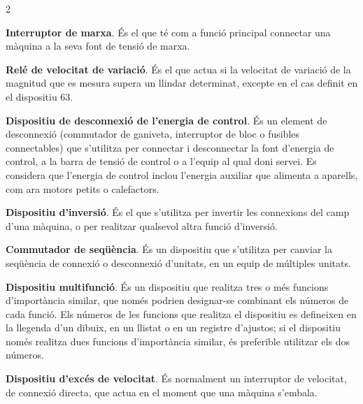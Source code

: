 \begin{multicols}{2}
\begin{list}{}
		\item[\textbf{6}]  
		\textbf{Interruptor de marxa}. És
		el que té com a funció principal connectar una màquina a la seva font de tensió de marxa.
		
		\item[\textbf{7}]    
		\textbf{Relé de velocitat de variació}. És el que
		actua si la velocitat de variació de la magnitud que es mesura supera un llindar determinat, excepte en el cas definit en el dispositiu 63.
		
		\item[\textbf{8}]   
		\textbf{Dispositiu de desconnexió de l'energia de control}. És un element de desconnexió (commutador de ganiveta,
		interruptor de bloc o fusibles connectables) que s'utilitza per
		connectar i desconnectar la font d'energia de control,  a la barra
		de tensió de control o a l'equip al qual doni servei. Es considera
		que l'energia de control inclou  l'energia auxiliar que alimenta a
		aparells, com ara motors petits o calefactors.
		
		\item[\textbf{9}]   
		\textbf{Dispositiu d'inversió}. És el
		que s'utilitza per invertir les connexions del camp d'una màquina, o
		per realitzar qualsevol altra funció  d'inversió.
		
		\item[\textbf{10}]   
		\textbf{Commutador de seqüència}. És un
		dispositiu que s'utilitza per canviar la seqüència de connexió o
		desconnexió d'unitats, en un equip de múltiples unitats.
		
		
		\item[\textbf{11}]  
		\textbf{Dispositiu multifunció}. És un dispositiu que realitza tres o més funcions d'importància similar, que només podrien designar-se combinant els números de cada funció. Els números de les funcions que realitza el dispositiu es defineixen en la llegenda d'un dibuix, en un llistat o en un registre d'ajustos; si el dispositiu només realitza dues funcions d'importància similar, és preferible utilitzar els dos números.
		
		\item[\textbf{12}]   
		\textbf{Dispositiu d'excés de velocitat}. És normalment un
		interruptor de velocitat, de connexió directa, que actua en el moment que una màquina  s'embala.
		

\end{list}
\end{multicols}
